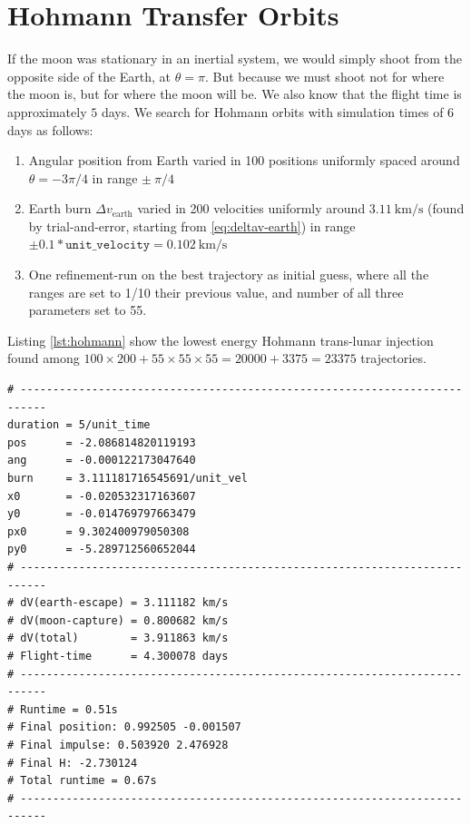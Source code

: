 \section{Hohmann Transfer Orbits}
If the moon was stationary in an inertial system, we would simply shoot from the opposite side of the Earth, at $\theta = \pi$. But because we must shoot not for where the moon is, but for where the moon will be. We also know that the flight time is approximately $5$ days. We search for Hohmann orbits with simulation times of 6 days as follows:
\begin{enumerate}
    \item Angular position from Earth varied in 100 positions uniformly spaced around $\theta=-3\pi/4$ in range $\pm\ \pi/4$
    \item Earth burn $\Delta v_{\text{earth}}$ varied in 200 velocities uniformly around $\SI{3.11}{\km\per\s}$ (found by trial-and-error, starting from \ref{eq:deltav-earth}) in range $\pm 0.1*\texttt{unit\_velocity} = \SI{0.102}{\km\per\s}$
    \item One refinement-run on the best trajectory as initial guess, where all the ranges are set to 1/10 their previous value, and number of all three parameters set to 55.
\end{enumerate}

Listing \ref{lst:hohmann} show the lowest energy Hohmann trans-lunar injection found among $100 \times 200 + 55 \times 55 \times 55  = 20000 + 3375 = 23375$ trajectories.

\begin{adjustwidth*}{0cm}{-0.4cm}
\begin{lstlisting}[caption={Best Hohmann orbit. \texttt{pos} = angular difference with start angle (here $\theta=-3\pi/4$), \texttt{ang} = angle to velocity vector in Earth parking orbit, \texttt{burn} = $\Delta v_{\text{earth}}$, \texttt{(x0,y0,px0,py0)} are the initial conditions.},label=lst:hohmann]
# --------------------------------------------------------------------------
duration = 5/unit_time
pos      = -2.086814820119193
ang      = -0.000122173047640
burn     = 3.111181716545691/unit_vel
x0       = -0.020532317163607
y0       = -0.014769797663479
px0      = 9.302400979050308
py0      = -5.289712560652044
# --------------------------------------------------------------------------
# dV(earth-escape) = 3.111182 km/s
# dV(moon-capture) = 0.800682 km/s
# dV(total)        = 3.911863 km/s
# Flight-time      = 4.300078 days
# --------------------------------------------------------------------------
# Runtime = 0.51s
# Final position: 0.992505 -0.001507
# Final impulse: 0.503920 2.476928
# Final H: -2.730124
# Total runtime = 0.67s
# --------------------------------------------------------------------------
\end{lstlisting}
\end{adjustwidth*}

